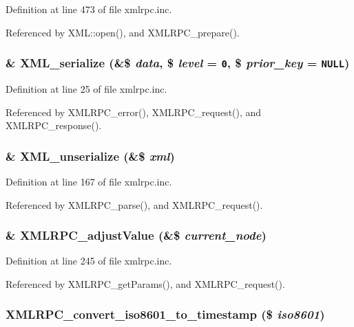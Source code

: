 Definition at line 473 of file xmlrpc.inc.

Referenced by XML::open(), and XMLRPC\_\-prepare().\hypertarget{xmlrpc_8inc_a1e9b05a06f28fabb86c10129f5890ef}{
\subsubsection{\setlength{\rightskip}{0pt plus 5cm}\& XML\_\-serialize (\&\$ {\em data}, \$ {\em level} = {\tt 0}, \$ {\em prior\_\-key} = {\tt NULL})}}
\label{xmlrpc_8inc_a1e9b05a06f28fabb86c10129f5890ef}




Definition at line 25 of file xmlrpc.inc.

Referenced by XMLRPC\_\-error(), XMLRPC\_\-request(), and XMLRPC\_\-response().\hypertarget{xmlrpc_8inc_ef8f3de498a12b230d049cdee6a25145}{
\subsubsection{\setlength{\rightskip}{0pt plus 5cm}\& XML\_\-unserialize (\&\$ {\em xml})}}
\label{xmlrpc_8inc_ef8f3de498a12b230d049cdee6a25145}




Definition at line 167 of file xmlrpc.inc.

Referenced by XMLRPC\_\-parse(), and XMLRPC\_\-request().\hypertarget{xmlrpc_8inc_d936fe41ae9c3e0b90bd72ffe82a2969}{
\subsubsection{\setlength{\rightskip}{0pt plus 5cm}\& XMLRPC\_\-adjustValue (\&\$ {\em current\_\-node})}}
\label{xmlrpc_8inc_d936fe41ae9c3e0b90bd72ffe82a2969}




Definition at line 245 of file xmlrpc.inc.

Referenced by XMLRPC\_\-getParams(), and XMLRPC\_\-request().\hypertarget{xmlrpc_8inc_1d9c2ef61c9f1fd2723d06d1364ef845}{
\subsubsection{\setlength{\rightskip}{0pt plus 5cm}XMLRPC\_\-convert\_\-iso8601\_\-to\_\-timestamp (\$ {\em iso8601})}}
\label{xmlrpc_8inc_1d9c2ef61c9f1fd2723d06d1364ef845}




